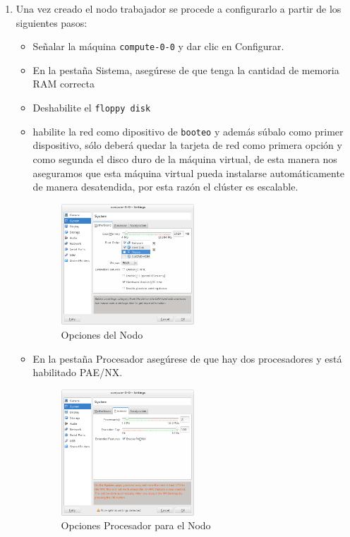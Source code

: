 \begin{enumerate}
\item Una vez creado el nodo trabajador se procede a configurarlo a partir de los siguientes pasos:

\begin{itemize}
	\item Señalar la máquina \texttt{compute-0-0} y dar clic en Configurar.

	\item En la pestaña Sistema, asegúrese de que tenga la cantidad de memoria RAM correcta

	\item Deshabilite el \texttt{floppy disk}

	\item habilite la red como dipositivo de \texttt{booteo} y además súbalo como primer dispositivo, sólo deberá quedar la tarjeta de red como primera opción y como segunda el disco duro de la máquina virtual, de esta manera nos aseguramos que esta máquina virtual pueda instalarse automáticamente de manera desatendida, por esta razón el clúster es escalable. 

	
	\begin{figure}[H]
		\centering
		\includegraphics[width=0.5\textwidth]{aux/nodoopsboot}
		\caption{Opciones del Nodo }
	\end{figure}
	


	\item En la pestaña Procesador asegúrese de que hay dos procesadores y está habilitado PAE/NX.



	\begin{figure}[H]
		\centering
		\includegraphics[width=0.5\textwidth]{aux/nodoprocesadores}
		\caption{Opciones Procesador para el Nodo}
	\end{figure}
		


\end{itemize}
\end{enumerate}
